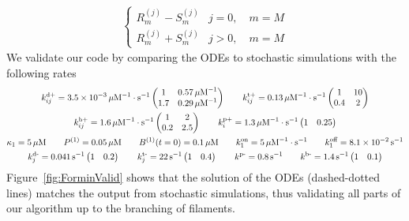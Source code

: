 \documentclass[11pt]{article}
\renewcommand{\j}[1]{{#1}^{(j)}}
\begin{document}
\begin{appendices}
\begin{subequations}
\begin{gather}
\begin{cases}
\j R_m -\j S_m & j =0,\quad m=M  \\
\j R_m +\j S_m & j > 0,\quad  m=M
 \end{cases}
\end{gather} 
\end{subequations}
We validate our code by comparing the ODEs to stochastic simulations with the following rates
\begin{gather}
\nonumber
k^\text{d+}_{ij} = 3.5 \times 10^{-3} \, \mu \textrm{M}^{-1} \cdot \text{s}^{-1} \begin{pmatrix} 1 & 0.57 \, \mu \textrm{M}^{-1} \\ 1.7 & 0.29  \, \mu \textrm{M}^{-1}\end{pmatrix} \qquad 
k^\text{t+}_{ij} = 0.13 \, \mu \textrm{M}^{-1} \cdot \text{s}^{-1} \begin{pmatrix} 1 & 10 \\ 0.4 & 2\end{pmatrix} \\ \label{eq:ODERates}
k^\text{b+}_{ij} = 1.6 \, \mu \textrm{M}^{-1} \cdot \text{s}^{-1} \begin{pmatrix} 1 & 2 \\ 0.2 & 2.5\end{pmatrix} \qquad k^\text{p+}_i = 1.3 \, \mu \textrm{M}^{-1} \cdot \text{s}^{-1} \begin{pmatrix} 1 & 0.25 \end{pmatrix}\\ \nonumber
\kappa_1 = 5 \, \mu \text{M} \qquad P^{(1)}=0.05 \, \mu \text{M} \qquad B^{(1)}(t=0)= 0.1 \, \mu \text{M}\qquad   k^\text{on}_1 = 5 \, \mu \textrm{M}^{-1} \cdot\text{s}^{-1}\qquad k^\text{off}_1 = 8.1 \times 10^{-2} \, \text{s}^{-1}  \\ \nonumber
k^\text{d-}_j = 0.041 \, \text{s}^{-1} \begin{pmatrix} 1 & 0.2 \end{pmatrix} \qquad 
k^\text{t-}_j = 22 \, \text{s}^{-1} \begin{pmatrix} 1 & 0.4 \end{pmatrix}\qquad 
k^\text{p-} = 0.8 \, \text{s}^{-1} \qquad k^\text{b-} = 1.4 \, \text{s}^{-1}\begin{pmatrix} 1 & 0.1 \end{pmatrix}
\end{gather}
Figure\ \ref{fig:ForminValid} shows that the solution of the ODEs (dashed-dotted lines) matches the output from stochastic simulations, thus validating all parts of our algorithm up to the branching of filaments. 


\end{appendices}
\end{document}
